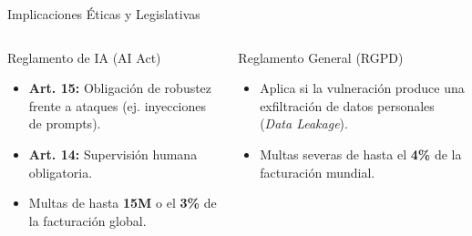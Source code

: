 \documentclass[aspectratio=169, 11pt]{beamer}
\begin{document}
\begin{frame}{Implicaciones Éticas y Legislativas}
    
    \begin{columns}
        \begin{block}{Reglamento de IA (AI Act)}
            \begin{itemize}
                \item \textbf{Art. 15:} Obligación de robustez frente a ataques (ej. inyecciones de prompts).
                \item \textbf{Art. 14:} Supervisión humana obligatoria.
                \item Multas de hasta \textbf{15M \texteuro} o el \textbf{3\%} de la facturación global.
            \end{itemize}
        \end{block}
        
        \begin{block}{Reglamento General (RGPD)}
            \begin{itemize}
                \item Aplica si la vulneración produce una exfiltración de datos personales (\textit{Data Leakage}).
                \item Multas severas de hasta el \textbf{4\%} de la facturación mundial.
            \end{itemize}
        \end{block}
    \end{columns}
\end{frame}
\end{document}
